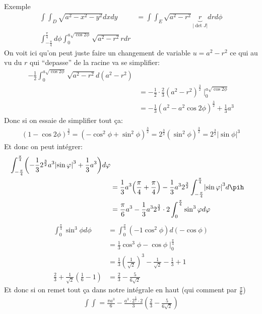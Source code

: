 \begin{parag}{Exemple}
\begin{align*}
            \int\int_D \sqrt{a^2 - x^2 - y^2} dxdy &= \int\int_E \sqrt{a^2-r^2} \underbrace{r}_{\left|\det J\right|}dr d\phi\\
            \int_{-\frac{\pi}{4}}^{\frac{\pi}{4}}d\phi \int_0^{a\sqrt{\cos 2\phi}}\sqrt{a^2 - r^2} rdr
        \end{align*}
        On voit ici qu'on peut juste faire un changement de variable $u = a^2 - r^2$ ce qui au vu du $r$ qui ``depasse'' de la racine va se simplifier:
        \begin{align*} 
            -\frac{1}{2}\int_0^{a\sqrt{\cos 2\phi}}\sqrt{a^2 - r^2}d\left(a^2 - r^2\right)\\ 
            &=  -\frac{1}{2} \cdot  \frac{2}{3} \left(a^2 - r^2\right)^{\frac{3}{2}}\mid_{0}^{a\sqrt{\cos 2\phi}}\\ 
            &= - \frac{1}{3}\left(a^2 - a^2 \cos 2 \phi\right)^{\frac{3}{2}} + \frac{1}{3}a^3
        \end{align*}
        Donc si on essaie de simplifier  tout ça:
        \begin{align*} 
            \left(1-\cos 2 \phi\right)^{\frac{3}{2}} =  \left(-\cos^2\phi + \sin^2\phi\right)^{\frac{3}{2}} = 2^{\frac{3}{2}}\left(\sin^2\phi\right)^{\frac{3}{2}} =  2^{\frac{3}{2}}\left|\sin\phi\right|^{3}
        \end{align*}
        Et donc on peut intégrer:
        \begin{align*} 
            \int_{-\frac{\pi}{4}}^{\frac{\pi}{4}} \left( - \frac{1}{3} 2^{\frac{3}{2}}a^3 \left|\sin \phi\right|^3 + \frac{1}{3}a^3\right) d\phi\\
            &=  \frac{1}{3}a^3 \left(\frac{\pi}{4} + \frac{\pi}{4}\right) - \frac{1}{3}a^3 2^{\frac{3}{2}}\int_{-\frac{\pi}{4}}^{\frac{\pi}{4}}\left| \sin\phi\right|^3 d\pih \\
            &= \frac{\pi}{6}a^3 - \frac{1}{3}a^3 2^{\frac{3}{2}}\cdot 2 \int_0^{\frac{\pi}{4}} \sin^3 \phi d \phi
        \end{align*}
        \begin{align*} 
            \int_0^{\frac{\pi}{4}} \sin^3 \phi d\phi &=  \int_0^{\frac{\pi}{4}}\left(-1 \cos^2\phi\right)d\left(-\cos\phi\right) \\
                                                     &=  \frac{1}{3} \cos^3\phi - \cos\phi \mid_0^{\frac{\pi}{4}} \\
                                                     &=  \frac{1}{3}\left(\frac{1}{\sqrt{2}}\right)^3 - \frac{1}{\sqrt{2}} - \frac{1}{3} + 1\\
            \frac{2}{3} + \frac{1}{\sqrt{2}}\left(\frac{1}{6} - 1\right) &=  \frac{2}{3}  - \frac{5}{6\sqrt{2}}
        \end{align*}
        Et donc si on remet tout ça dans notre intégrale en haut (qui comment par $\frac{\pi}{6}$)
        \begin{align*} 
            \int\int =  \frac{\pi a^3}{6} - \frac{a^3 \cdot  2^{\frac{3}{2}} \cdot  2}{3} \left(\frac{2}{3} - \frac{5}{6\sqrt{2}}\right) 
        \end{align*}
\end{parag}

